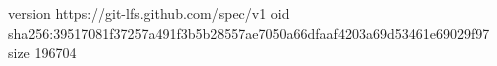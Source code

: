 version https://git-lfs.github.com/spec/v1
oid sha256:39517081f37257a491f3b5b28557ae7050a66dfaaf4203a69d53461e69029f97
size 196704
